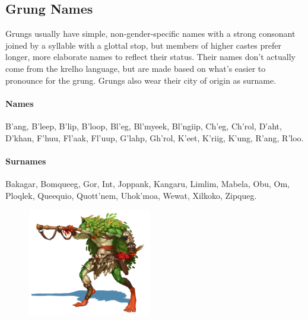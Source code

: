 \begin{linenumbers}
\subsection*{Grung Names}
Grungs usually have simple, non-gender-specific names with a strong consonant joined by a syllable with a glottal stop, but members of higher castes prefer longer, more elaborate names to reflect their status.
Their names don't actually come from the krelho language, but are made based on what's easier to pronounce for the grung.
Grungs also wear their city of origin as surname.

\paragraph{Names}
B'ang, B'leep, B'lip, B'loop, Bl'eg, Bl'myeek, Bl'ngiip, Ch'eg, Ch'rol, D'aht, D'khan, F'huu, Fl'aak, Fl'uup, G'lahp, Gh'rol, K'eet, K'riig, K'ung, R'ang, R'loo.

\paragraph{Surnames} Bakagar, Bomqueeg, Gor, Int, Joppank, Kangaru, Limlim, Mabela, Obu, Om, Ploqlek, Queequio, Quott'nem, Uhok'moa, Wewat, Xilkoko, Zipqueg.

\begin{figure}[!t]
    \centering
    \includegraphics[width=0.48\textwidth]{02kins/img/18grung_blowgun.jpg}
\end{figure}


\end{linenumbers}
